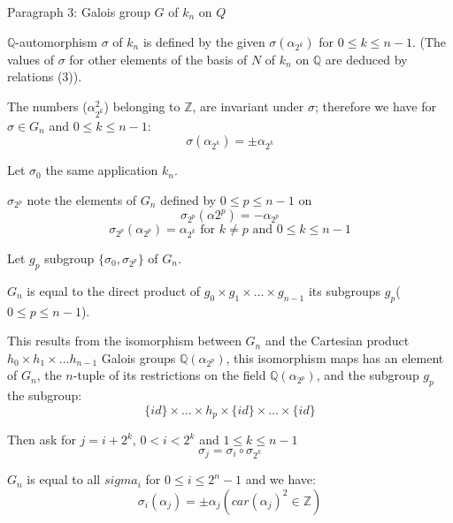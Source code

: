 \documentclass{article}
\begin{document}
{\large Paragraph 3: Galois group $G$ of $k_n$ on $Q$}
\par $\mathbb{Q}$-automorphism $\sigma$ of $k_n$ is defined by the given $\sigma(\alpha_{2^k})$ for $0\leq k \leq n-1$. (The values of $\sigma$ for other elements of the basis of $N$ of $k_n$ on $\mathbb{Q}$ are deduced by relations (3)).
\par The numbers ($\alpha_{2^k}^2$) belonging to $\mathbb{Z}$, are invariant under $\sigma$; therefore we have for $\sigma \in G_n$ and $0\leq k \leq n-1$:
$$ \sigma(\alpha_{2^k}) = \pm \alpha_{2^k}$$
\par Let $\sigma_0$ the same application $k_n$.
\par $\sigma_{2^p}$ note the elements of $G_n$ defined by $0\leq p \leq n-1$ on 
$$ \sigma_{2^p} (\alpha 2^p) = -\alpha_{2^p}$$
$$ \sigma_{2^p}(\alpha_{2^p}) = \alpha_{2^k} \text{ for } k\neq p \text{ and } 0 \leq k \leq n-1$$
\par Let $g_p$ subgroup $\{\sigma_0,\sigma_{2^p}\}$ of $G_n$.
\par $G_n$ is equal to the direct product of $g_0 \times g_1 \times \ldots \times g_{n-1}$ its subgroups $g_p $($0 \leq p \leq n-1$).
\par This results from the isomorphism between $G_n$ and the Cartesian product $h_0 \times h_1 \times \ldots h_{n-1}$ Galois groups $\mathbb{Q}(\alpha_{2^p})$, this isomorphism maps has an element of $G_n$, the $n$-tuple of its restrictions on the field $\mathbb{Q}(\alpha_{2^p})$, and the subgroup $g_p$ the subgroup:
$$ \{id\} \times \ldots \times h_p \times \{id\} \times \ldots \times \{id\}$$
\par Then ask for $j=i+2^k$, $0 < i < 2^k$ and $1 \leq k \leq n-1$
$$\sigma_j = \sigma_i \circ \sigma_{2^k}$$
\par $G_n$ is equal to all $sigma_i$ for $0 \leq i \leq 2^n-1$ and we have:
$$ \sigma_i (\alpha_j) = \pm \alpha_j (car(\alpha_j)^2 \in \mathbb{Z})$$
\end{document}
